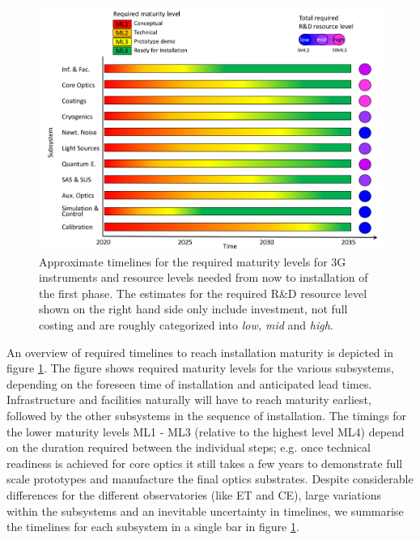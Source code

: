 \section*{}
\begin{figure}[h]
\centering
\includegraphics*[width= \textwidth]{Figures/3G_Readiness_Levelsblue.pdf}
\caption{Approximate timelines for the required maturity levels for 3G instruments and resource levels needed from now to installation of the first phase. The estimates for the required R\&D resource level shown on the right hand side only include investment, not full costing and are roughly categorized into \textit{low, mid} and \textit{high}.\\
}
\label{fig:maturity}
\end{figure}

An overview of required timelines to reach installation maturity is depicted in figure \ref{fig:maturity}. The figure shows required maturity levels for the various subsystems, depending on the foreseen time of installation and anticipated lead times. Infrastructure and facilities naturally will have to reach maturity earliest, followed by the other subsystems in the sequence of installation. The timings for the lower maturity levels ML1 - ML3 (relative to the highest level ML4) depend on the duration required between the individual steps; e.g. once technical readiness is achieved for core optics it still takes a few years to demonstrate full scale prototypes and manufacture the final optics substrates. Despite considerable differences for the different observatories (like ET and CE), large variations within the subsystems and an inevitable uncertainty in timelines, we summarise the timelines  for each subsystem in a single bar in figure \ref{fig:maturity}.  

